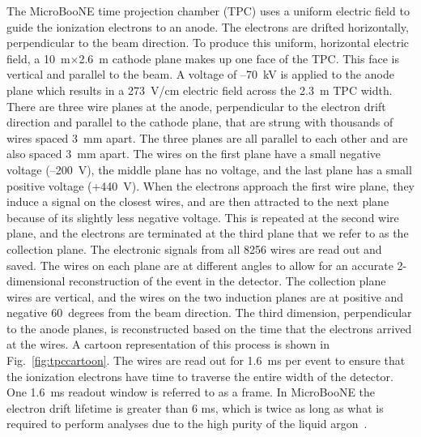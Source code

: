   The MicroBooNE time projection chamber (TPC) uses a uniform electric field to
  guide the ionization electrons to an anode. The electrons are drifted
  horizontally, perpendicular to the beam direction. To produce this uniform,
  horizontal electric field, a 10~m$\times$2.6~m cathode plane makes up one
  face of the TPC. This face is vertical and parallel to the beam. A voltage of
  --70~kV is applied to the anode plane which results in a 273~V/cm electric
  field across the 2.3~m TPC width.  There are three wire planes at the anode,
  perpendicular to the electron drift direction and parallel to the cathode
  plane, that are strung with thousands of wires spaced 3~mm apart.  The three
  planes are all parallel to each other and are also spaced 3~mm apart.  The
  wires on the first plane have a small negative voltage (--200~V), the middle
  plane has no voltage, and the last plane has a small positive voltage
  (+440~V). When the electrons approach the first wire plane, they induce a
  signal on the closest wires, and are then attracted to the next plane because
  of its slightly less negative voltage. This is repeated at the second wire
  plane, and the electrons are terminated at the third plane that we refer to
  as the collection plane. The electronic signals from all 8256 wires are read
  out and saved. The wires on each plane are at different angles to allow for
  an accurate 2-dimensional reconstruction of the event in the detector. The
  collection plane wires are vertical, and the wires on the two induction
  planes are at positive and negative 60~degrees from the beam direction. The
  third dimension, perpendicular to the anode planes, is reconstructed based on
  the time that the electrons arrived at the wires. A cartoon representation of
  this process is shown in Fig.~\ref{fig:tpccartoon}. The wires are read out
  for 1.6~ms per event to ensure that the ionization electrons have time to
  traverse the entire width of the detector. One 1.6~ms readout window is
  referred to as a frame. In MicroBooNE the electron drift lifetime is
  greater than 6 ms, which is twice as long as what is required to perform
  analyses due to the high purity of the liquid argon~\cite{uBPurityNote}. 

